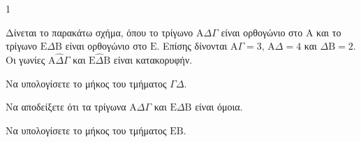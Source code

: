 \begin{ylh}{1}
    \item [Τρίγωνα, Πυθαγόρειο Θεώρημα, Ομοιότητα Τριγώνων]
\end{ylh}
\begin{figure} %
    \centering
\end{figure}
Δίνεται το παρακάτω σχήμα, όπου το τρίγωνο $\mathrm{A}\Delta\Gamma$ είναι ορθογώνιο στο $\mathrm{A}$ και το τρίγωνο $\mathrm{E}\Delta\mathrm{B}$ είναι ορθογώνιο στο $\mathrm{E}$.
Επίσης δίνονται $\mathrm{A}\Gamma = 3$, $\mathrm{A}\Delta = 4$ και $\Delta\mathrm{B} = 2$.
Οι γωνίες $\mathrm{A}\hat{\Delta}\Gamma$ και $\mathrm{E}\hat{\Delta}\mathrm{B}$ είναι κατακορυφήν.

\begin{alist}
    \item Να υπολογίσετε το μήκος του τμήματος $\Gamma\Delta$.
    \item Να αποδείξετε ότι τα τρίγωνα $\mathrm{A}\Delta\Gamma$ και $\mathrm{E}\Delta\mathrm{B}$ είναι όμοια.
    \item Να υπολογίσετε το μήκος του τμήματος $\mathrm{EB}$.
\end{alist}